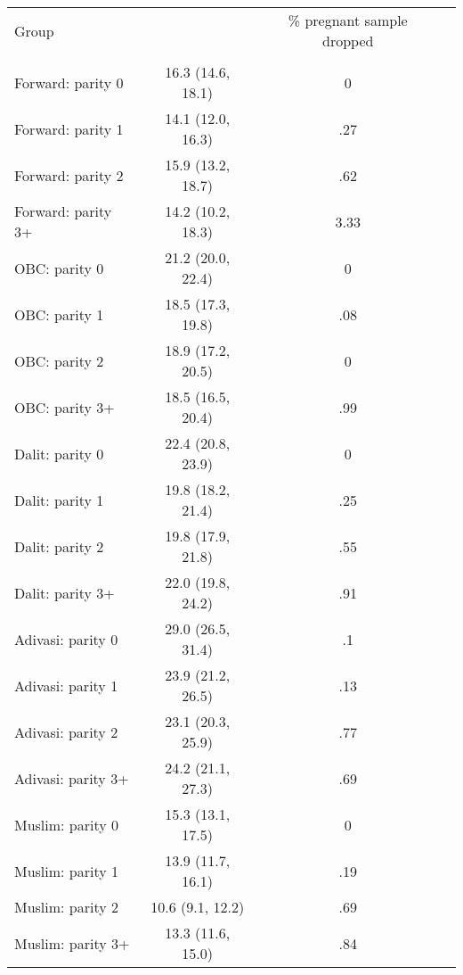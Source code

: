 \begin{tabular}{lccc}
\toprule
Group &  & \% pregnant sample dropped \\\\
\midrule
Forward: parity 0&16.3 (14.6, 18.1)&0\\
Forward: parity 1&14.1 (12.0, 16.3)&.27\\
Forward: parity 2&15.9 (13.2, 18.7)&.62\\
Forward: parity 3+&14.2 (10.2, 18.3)&3.33\\
OBC: parity 0&21.2 (20.0, 22.4)&0\\
OBC: parity 1&18.5 (17.3, 19.8)&.08\\
OBC: parity 2&18.9 (17.2, 20.5)&0\\
OBC: parity 3+&18.5 (16.5, 20.4)&.99\\
Dalit: parity 0&22.4 (20.8, 23.9)&0\\
Dalit: parity 1&19.8 (18.2, 21.4)&.25\\
Dalit: parity 2&19.8 (17.9, 21.8)&.55\\
Dalit: parity 3+&22.0 (19.8, 24.2)&.91\\
Adivasi: parity 0&29.0 (26.5, 31.4)&.1\\
Adivasi: parity 1&23.9 (21.2, 26.5)&.13\\
Adivasi: parity 2&23.1 (20.3, 25.9)&.77\\
Adivasi: parity 3+&24.2 (21.1, 27.3)&.69\\
Muslim: parity 0&15.3 (13.1, 17.5)&0\\
Muslim: parity 1&13.9 (11.7, 16.1)&.19\\
Muslim: parity 2&10.6 (9.1, 12.2)&.69\\
Muslim: parity 3+&13.3 (11.6, 15.0)&.84\\
\bottomrule
\end{tabular}
